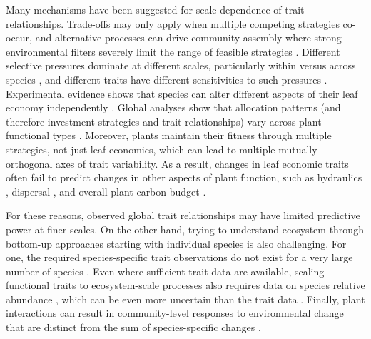 \documentclass{article}
\begin{document}
Many mechanisms have been suggested for scale-dependence of trait relationships.
Trade-offs may only apply when multiple competing strategies co-occur, and alternative processes can drive community assembly where strong environmental filters severely limit the range of feasible strategies \citep{rosado_2017_relative,grime_2012_evolutionary}.
Different selective pressures dominate at different scales, particularly within versus across species \citep{albert_2010_intraspecific_functional_variability,messier_2010_how,kichenin_2013_contrasting},
and different traits have different sensitivities to such pressures \citep{messier_2016_trait}.
Experimental evidence shows that species can alter different aspects of their leaf economy independently \citep{wright_2012_does}.
Global analyses show that allocation patterns (and therefore investment strategies and trait relationships) vary across plant functional types \citep{ghimire_2017_global}.
Moreover, plants maintain their fitness through multiple strategies, not just leaf economics, which can lead to multiple mutually orthogonal axes of trait variability.
As a result, changes in leaf economic traits often fail to predict changes in other aspects of plant function, such as
hydraulics \citep{li_2015_leaf},
dispersal \citep{westoby_2002_plant_ecological_strategies},
and overall plant carbon budget \citep{edwards_2014_leaf}.

For these reasons, observed global trait relationships may have limited predictive power at finer scales.
On the other hand, trying to understand ecosystem through bottom-up approaches starting with individual species is also challenging.
For one, the required species-specific trait observations do not exist for a very large number of species \citep{cornwell_2019_what}.
Even where sufficient trait data are available, scaling functional traits to ecosystem-scale processes also requires data on species relative abundance \citep{grime_1998_benefits},
which can be even more uncertain than the trait data \citep{clark_2016_why}.
Finally, plant interactions can result in community-level responses to environmental change that are distinct from the sum of species-specific changes \citep{poorter_2003_plant}.
\end{document}

